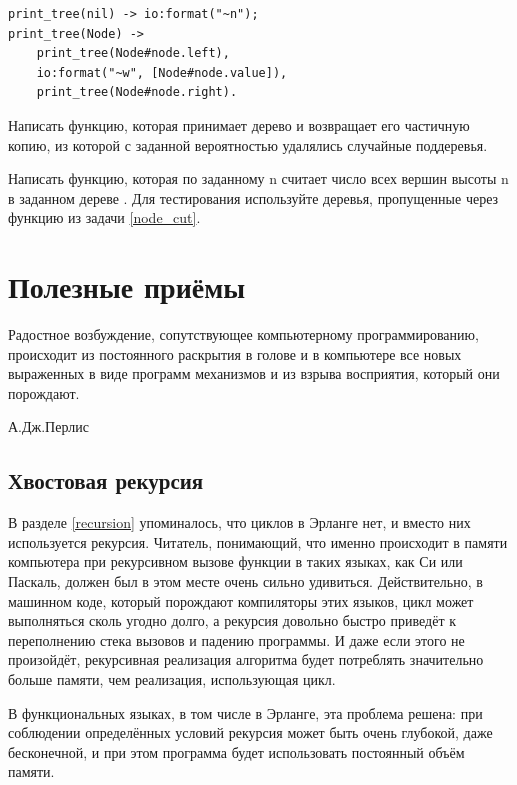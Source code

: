 \documentclass[
  paper=a4,
  fontsize=14pt,
  openany,
  appendixprefix=true
]{scrbook}
\begin{document}
\begin{lstlisting}
print_tree(nil) -> io:format("~n");
print_tree(Node) ->
    print_tree(Node#node.left),
    io:format("~w", [Node#node.value]),
    print_tree(Node#node.right).
\end{lstlisting}

\begin{problem}\label{node_cut}
Написать функцию, которая принимает дерево и возвращает его частичную копию, из которой с заданной вероятностью удалялись случайные поддеревья.
\end{problem}

\begin{problem}\label{node_count}
Написать функцию, которая по заданному n считает число всех вершин высоты n в заданном дереве \cite[7.2.5]{shen}. Для тестирования используйте деревья, пропущенные через функцию из задачи \ref{node_cut}.
\end{problem}

\chapter{Полезные приёмы}
\label{useful}

\epigraph{Радостное возбуждение, сопутствующее компьютерному программированию, происходит из постоянного раскрытия в голове и в компьютере все новых выраженных в виде программ механизмов и из взрыва восприятия, который они порождают.}{А.Дж.Перлис}

\section{Хвостовая рекурсия}
\label{tailrecursion}

В разделе \ref{recursion} упоминалось, что циклов в Эрланге нет, и вместо них используется рекурсия. Читатель, понимающий, что именно происходит в памяти компьютера при рекурсивном вызове функции в таких языках, как Си или Паскаль, должен был в этом месте очень сильно удивиться. Действительно, в машинном коде, который порождают компиляторы этих языков, цикл может выполняться сколь угодно долго, а рекурсия довольно быстро приведёт к переполнению стека вызовов и падению программы. И даже если этого не произойдёт, рекурсивная реализация алгоритма будет потреблять значительно больше памяти, чем реализация, использующая цикл.

В функциональных языках, в том числе в Эрланге, эта проблема решена: при соблюдении определённых условий рекурсия может быть очень глубокой, даже бесконечной, и при этом программа будет использовать постоянный объём памяти.
\end{document}
